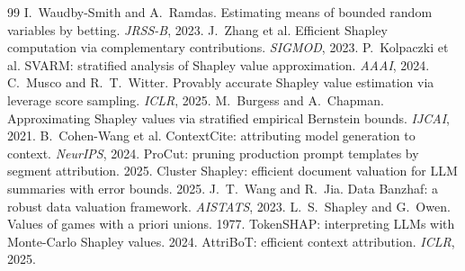 \documentclass[10pt,twocolumn,letterpaper]{article}
\theoremstyle{plain}
\theoremstyle{definition}
\begin{document}
{\small

\begin{thebibliography}{99}
 I.~Waudby-Smith and A.~Ramdas. Estimating means of bounded random
variables by betting. \emph{JRSS-B}, 2023.
 J.~Zhang et al. Efficient Shapley computation via complementary
contributions. \emph{SIGMOD}, 2023.
 P.~Kolpaczki et al. SVARM: stratified analysis of Shapley value
approximation. \emph{AAAI}, 2024.
 C.~Musco and R.~T.~Witter. Provably accurate Shapley value
estimation via leverage score sampling. \emph{ICLR}, 2025.
 M.~Burgess and A.~Chapman. Approximating Shapley values via
stratified empirical Bernstein bounds. \emph{IJCAI}, 2021.
 B.~Cohen-Wang et al. ContextCite: attributing model
generation to context. \emph{NeurIPS}, 2024.
 ProCut: pruning production prompt templates by segment
attribution. 2025.
 Cluster Shapley: efficient document valuation for LLM
summaries with error bounds. 2025.
 J.~T.~Wang and R.~Jia. Data Banzhaf: a robust data valuation
framework. \emph{AISTATS}, 2023.
 L.~S.~Shapley and G.~Owen. Values of games with a priori unions.
1977.
 TokenSHAP: interpreting LLMs with Monte-Carlo Shapley values.
2024.
 AttriBoT: efficient context attribution. \emph{ICLR}, 2025.
\end{thebibliography}
}
\end{document}
